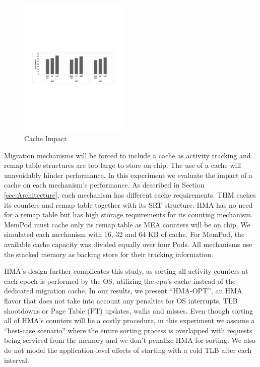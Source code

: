 \begin{figure}
  \includegraphics[width=0.46\textwidth]{figures/cache_impact.pdf}
  \caption{Cache Impact}
  \label{fig:cache}
\end{figure}

Migration mechanisms will be forced to include a cache as activity tracking and remap table structures are too large to store on-chip. The use of a cache will unavoidably hinder performance. In this experiment we evaluate the impact of a cache on each mechanism's performance. As described in Section \ref{sec:Architecture}, each mechanism has different cache requirements. THM caches its counters and remap table together with its SRT structure. HMA has no need for a remap table but has high storage requirements for its counting mechanism. MemPod must cache only its remap table as MEA counters will be on chip. We simulated each mechanism with 16, 32 and 64 KB of cache. For MemPod, the available cache capacity was divided equally over four Pods. All mechanisms use the stacked memory as backing store for their tracking information.

HMA's design further complicates this study, as sorting all activity counters at each epoch is performed by the OS, utilizing the cpu's cache instead of the dedicated migration cache. In our results, we present ``HMA-OPT'', an HMA flavor that does not take into account any penalties for OS interrupts, TLB shootdowns or Page Table (PT) updates, walks and misses. Even though sorting all of HMA's counters will be a costly procedure, in this experiment we assume a ``best-case scenario'' where the entire sorting process is overlapped with requests being serviced from the memory and we don't penalize HMA for sorting. We also do not model the application-level effects of starting with a cold TLB after each interval.

